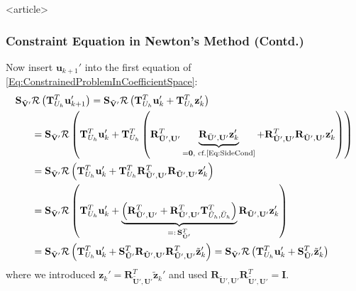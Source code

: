 \begin{frame}<article>
\frametitle<presentation>{Constraint Equation in Newton's Method (Contd.)}
Now insert  $\mathbf{u}_{k+1}'$ into the first equation of
\eqref{Eq:ConstrainedProblemInCoefficientSpace}:
\begin{equation}
\begin{split}
\mathbf{S}_{\tilde{\mathbf{V}}'}
&\mathcal{R}\left(\mathbf{T}^T_{U_h}\mathbf{u}_{k+1}'\right)
= \mathbf{S}_{\tilde{\mathbf{V}}'}
\mathcal{R}\left(\mathbf{T}^T_{U_h}\mathbf{u}_{k}' +
\mathbf{T}^T_{U_h}\mathbf{z}_{k}' \right)\\
&= \mathbf{S}_{\tilde{\mathbf{V}}'}
\mathcal{R}\left(\mathbf{T}^T_{U_h}\mathbf{u}_{k}' +
\mathbf{T}^T_{U_h} \left(\mathbf{R}^T_{\bar{\mathbf{U}}',\mathbf{U}'}
\underbrace{\mathbf{R}_{\bar{\mathbf{U}}',\mathbf{U}'}
  \mathbf{z}_{k}'}_{=\mathbf{0}, \text{ cf.\eqref{Eq:SideCond}}} +
\mathbf{R}^T_{\tilde{\mathbf{U}}',\mathbf{U}'}
\mathbf{R}_{\tilde{\mathbf{U}}',\mathbf{U}'} \mathbf{z}_{k}' \right)
\right)\\
&= \mathbf{S}_{\tilde{\mathbf{V}}'}
\mathcal{R}\left(\mathbf{T}^T_{U_h}\mathbf{u}_{k}' +
\mathbf{T}^T_{U_h} \mathbf{R}^T_{\tilde{\mathbf{U}}',\mathbf{U}'}
\mathbf{R}_{\tilde{\mathbf{U}}',\mathbf{U}'} \mathbf{z}_{k}' \right)\\
&= \mathbf{S}_{\tilde{\mathbf{V}}'}
\mathcal{R}\left(\mathbf{T}^T_{U_h}\mathbf{u}_{k}' +
\underbrace{\left(\mathbf{R}^T_{\tilde{\mathbf{U}}',\mathbf{U}'} +
\mathbf{R}^T_{\bar{\mathbf{U}}',\mathbf{U}'} \mathbf{T}^T_{\tilde{U}_h,\bar{U}_h}
\right)}_{=: \,\mathbf{S}^T_{\tilde{\mathbf{U}}'}}
\mathbf{R}_{\tilde{\mathbf{U}}',\mathbf{U}'} \mathbf{z}_{k}'
\right) \\
&=
\mathbf{S}_{\tilde{\mathbf{V}}'}
\mathcal{R}\left(\mathbf{T}^T_{U_h}\mathbf{u}_{k}' +
\mathbf{S}^T_{\tilde{\mathbf{U}}'}
\mathbf{R}_{\tilde{\mathbf{U}}',\mathbf{U}'}
\mathbf{R}^T_{\tilde{\mathbf{U}}',\mathbf{U}'} \tilde{\mathbf{z}}_{k}'
\right)
=
\mathbf{S}_{\tilde{\mathbf{V}}'}
\mathcal{R}\left(\mathbf{T}^T_{U_h}\mathbf{u}_{k}' +
\mathbf{S}^T_{\tilde{\mathbf{U}}'} \tilde{\mathbf{z}}_{k}'\right)
\end{split}
\end{equation}
where we introduced $\mathbf{z}_{k}' =
\mathbf{R}^T_{\tilde{\mathbf{U}}',\mathbf{U}'}
\tilde{\mathbf{z}}_{k}'$ and used $\mathbf{R}_{\tilde{\mathbf{U}}',\mathbf{U}'}
\mathbf{R}^T_{\tilde{\mathbf{U}}',\mathbf{U}'}=\mathbf{I}$.
\end{frame}


